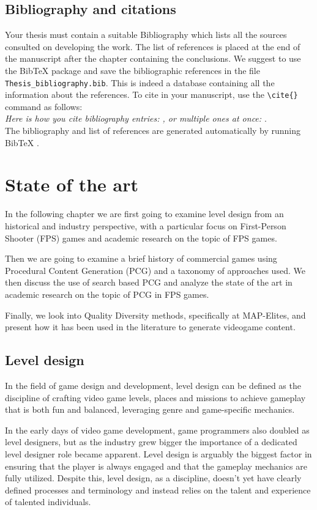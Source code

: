 \documentclass{Configuration_Files/PoliMi3i_thesis}
\begin{document}
\section{Bibliography and citations}
Your thesis must contain a suitable Bibliography which lists all the sources consulted on developing the work.
The list of references is placed at the end of the manuscript after the chapter containing the conclusions.
We suggest to use the BibTeX package and save the bibliographic references  in the file \verb|Thesis_bibliography.bib|.
This is indeed a database containing all the information about the references. To cite in your manuscript, use the \verb|\cite{}| command as follows:
\\
\textit{Here is how you cite bibliography entries: \cite{knuth74}, or multiple ones at once: \cite{knuth92,lamport94}}.
\\
The bibliography and list of references are generated automatically by running BibTeX \cite{bibtex}.

\chapter{State of the art}
\label{ch:state_of_the_art}
In the following chapter we are first going to examine level design from an historical and industry perspective, with a particular focus on First-Person Shooter (FPS) games and academic research on the topic of FPS games.

Then we are going to examine a brief history of commercial games using Procedural Content Generation (PCG) and a taxonomy of approaches used. We then discuss the use of search based PCG and analyze the state of the art in academic research on the topic of PCG in FPS games.

Finally, we look into Quality Diversity methods, specifically at MAP-Elites, and present how it has been used in the literature to generate videogame content.

\section{Level design}
\label{sec:level_design}
In the field of game design and development, level design can be defined as the discipline of crafting video game levels, places and missions to achieve gameplay that is both fun and balanced, leveraging genre and game-specific mechanics.

In the early days of video game development, game programmers also doubled as level designers, but as the industry grew bigger the importance of a dedicated level designer role became apparent. Level design is arguably the biggest factor in ensuring that the player is always engaged and that the gameplay mechanics are fully utilized. Despite this, level design, as a discipline, doesn't yet have clearly defined processes and terminology and instead relies on the talent and experience of talented individuals.
\end{document}
